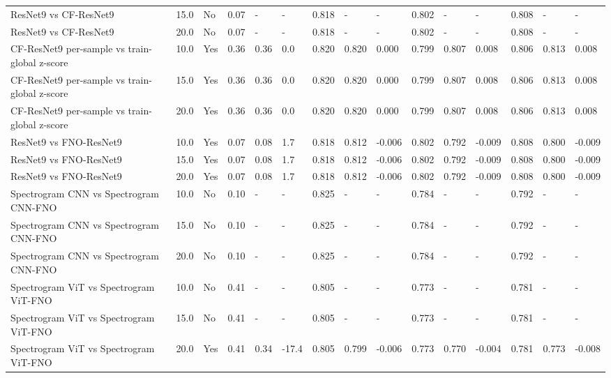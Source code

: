 \begin{longtable}{lllllllllllllll}
ResNet9 vs CF-ResNet9 & 15.0 & No & 0.07 & - & - & 0.818 & - & - & 0.802 & - & - & 0.808 & - & - \\
ResNet9 vs CF-ResNet9 & 20.0 & No & 0.07 & - & - & 0.818 & - & - & 0.802 & - & - & 0.808 & - & - \\
CF-ResNet9 per-sample vs train-global z-score & 10.0 & Yes & 0.36 & 0.36 & 0.0 & 0.820 & 0.820 & 0.000 & 0.799 & 0.807 & 0.008 & 0.806 & 0.813 & 0.008 \\
CF-ResNet9 per-sample vs train-global z-score & 15.0 & Yes & 0.36 & 0.36 & 0.0 & 0.820 & 0.820 & 0.000 & 0.799 & 0.807 & 0.008 & 0.806 & 0.813 & 0.008 \\
CF-ResNet9 per-sample vs train-global z-score & 20.0 & Yes & 0.36 & 0.36 & 0.0 & 0.820 & 0.820 & 0.000 & 0.799 & 0.807 & 0.008 & 0.806 & 0.813 & 0.008 \\
ResNet9 vs FNO-ResNet9 & 10.0 & Yes & 0.07 & 0.08 & 1.7 & 0.818 & 0.812 & -0.006 & 0.802 & 0.792 & -0.009 & 0.808 & 0.800 & -0.009 \\
ResNet9 vs FNO-ResNet9 & 15.0 & Yes & 0.07 & 0.08 & 1.7 & 0.818 & 0.812 & -0.006 & 0.802 & 0.792 & -0.009 & 0.808 & 0.800 & -0.009 \\
ResNet9 vs FNO-ResNet9 & 20.0 & Yes & 0.07 & 0.08 & 1.7 & 0.818 & 0.812 & -0.006 & 0.802 & 0.792 & -0.009 & 0.808 & 0.800 & -0.009 \\
Spectrogram CNN vs Spectrogram CNN-FNO & 10.0 & No & 0.10 & - & - & 0.825 & - & - & 0.784 & - & - & 0.792 & - & - \\
Spectrogram CNN vs Spectrogram CNN-FNO & 15.0 & No & 0.10 & - & - & 0.825 & - & - & 0.784 & - & - & 0.792 & - & - \\
Spectrogram CNN vs Spectrogram CNN-FNO & 20.0 & No & 0.10 & - & - & 0.825 & - & - & 0.784 & - & - & 0.792 & - & - \\
Spectrogram ViT vs Spectrogram ViT-FNO & 10.0 & No & 0.41 & - & - & 0.805 & - & - & 0.773 & - & - & 0.781 & - & - \\
Spectrogram ViT vs Spectrogram ViT-FNO & 15.0 & No & 0.41 & - & - & 0.805 & - & - & 0.773 & - & - & 0.781 & - & - \\
Spectrogram ViT vs Spectrogram ViT-FNO & 20.0 & Yes & 0.41 & 0.34 & -17.4 & 0.805 & 0.799 & -0.006 & 0.773 & 0.770 & -0.004 & 0.781 & 0.773 & -0.008 \\
\end{longtable}
